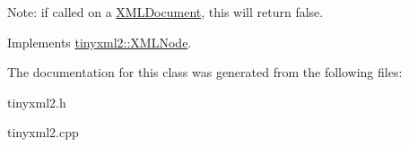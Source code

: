 Note\+: if called on a \hyperlink{classtinyxml2_1_1_x_m_l_document}{X\+M\+L\+Document}, this will return false. 

Implements \hyperlink{classtinyxml2_1_1_x_m_l_node_ac50408e91e095237f45716092ac2bddc}{tinyxml2\+::\+X\+M\+L\+Node}.



The documentation for this class was generated from the following files\+:\begin{DoxyCompactItemize}
\item 
tinyxml2.\+h\item 
tinyxml2.\+cpp\end{DoxyCompactItemize}
